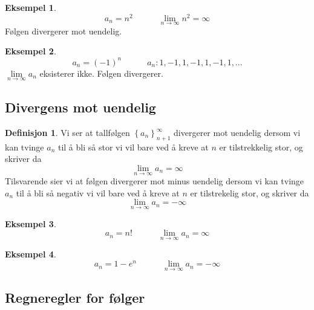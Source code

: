 \documentclass[11pt]{article}
\theoremstyle{definition}
\newtheorem{mindef}{Definisjon}[section]
\newenvironment{fmindef}
{\begin{mdframed}[style=minstil]\begin{mindef}}
		{\end{mindef}\end{mdframed}}
\theoremstyle{definition}
\newtheorem{mitteks}{Eksempel}[section]
\theoremstyle{definition}
\theoremstyle{definition}
\theoremstyle{definition}
\theoremstyle{definition}
\begin{document}
		\begin{mitteks}
		  	\[	a_n=n^2 \hspace{36pt}
			\lim\limits_{n\rightarrow \infty}n^2=\infty\]	
	         Følgen divergerer mot uendelig.
		\end{mitteks}
		
		\begin{mitteks}
		 	\[	a_n=(-1)^n \hspace{36pt} a_n:1,-1,1,-1,1,-1,1,...\]			
		 	\(\lim\limits_{n\rightarrow \infty}a_n\) 
		 	eksisterer ikke. Følgen divergerer.
		\end{mitteks}

		\newpage

		\subsection{Divergens mot uendelig}
		 
		 \begin{fmindef}
		 	Vi ser at tallfølgen \(\left\lbrace a_n \right\rbrace^{\infty}_{n+1} \) divergerer mot uendelig dersom vi kan tvinge \(a_n\) til å bli så stor vi vil bare ved å kreve at \(n\) er tilstrekkelig stor, og skriver da
		 	\[\lim\limits_{n\rightarrow \infty}a_n=\infty \]
		 	Tilsvarende sier vi at følgen divergerer mot minus uendelig dersom vi kan tvinge \(a_n\) til å bli så negativ vi vil bare ved å kreve at \(n\) er tilstrekelig stor, og skriver da 
		 	\[\lim\limits_{n\rightarrow \infty}a_n=-\infty \]
		 \end{fmindef}
		 
		 \begin{mitteks}
		 	\[a_n=n! \hspace{36pt}\lim\limits_{n\rightarrow \infty}a_n=\infty \]
		 \end{mitteks}
		 
		 \begin{mitteks}
		 	\[a_n=1-e^n\hspace{36pt} \lim\limits_{n\rightarrow \infty}a_n=-\infty \]
		 \end{mitteks}
		 
		 \newpage
		 
		\subsection{Regneregler for følger}
		
\end{document}

